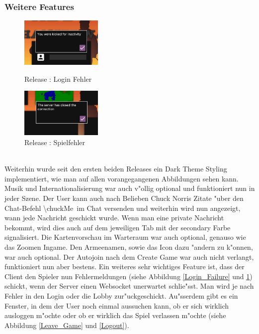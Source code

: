 \documentclass[12pt, titlepage]{scrartcl}
\newcommand{\RN}[1]{%
	\textup{\uppercase\expandafter{\romannumeral#1}}%
}
\begin{document}
		    \subsubsection{Weitere Features}
		        \begin{figure}
                    \begin{center}
                        \includegraphics[width=0.35\textwidth]{images/old_state/additional/LoginFailure.png}
                        \caption{Release \RN{2}: Login Fehler}
                        \label{Login_Failure}
                    \end{center}
                    \begin{center}
                        \includegraphics[width=0.35\textwidth]{images/old_state/additional/WaitingRoomFailure.png}
                        \caption{Release \RN{2}: Spielfehler}
                        \label{Game_Failure}
                    \end{center}
                \end{figure}
		        \ \\ Weiterhin wurde seit den ersten beiden Releases ein Dark Theme Styling implementiert, wie man auf allen vorangegangenen Abbildungen sehen kann. Musik und Internationalisierung war auch v"ollig optional und funktioniert nun in jeder Szene. Der User kann auch nach Belieben Chuck Norris Zitate "uber den Chat-Befehl \glqq \textbackslash chuckMe\grqq\ im Chat versenden und weiterhin wird nun angezeigt, wann jede Nachricht geschickt wurde. Wenn man eine private Nachricht bekommt, wird dies auch auf dem jeweiligen Tab mit der secondary Farbe signalisiert. Die Kartenvorschau im Warteraum war auch optional, genauso wie das Zoomen Ingame. Den Armeenamen, sowie das Icon dazu "andern zu k"onnen, war auch optional. Der Autojoin nach dem Create Game war auch nicht verlangt, funktioniert nun aber bestens. Ein weiteres sehr wichtiges Feature ist, dass der Client den Spieler nun Fehlermeldungen (siehe Abbildung \ref{Login_Failure} und \ref{Game_Failure}) schickt, wenn der Server einen Websocket unerwartet schlie"sst. Man wird je nach Fehler in den Login oder die Lobby zur"uckgeschickt. Au"sserdem gibt es ein Fenster, in dem der User noch einmal aussuchen kann, ob er sich wirklich ausloggen m"ochte oder ob er wirklich das Spiel verlassen m"ochte (siehe Abbildung \ref{Leave_Game} und \ref{Logout}). \\
\end{document}
